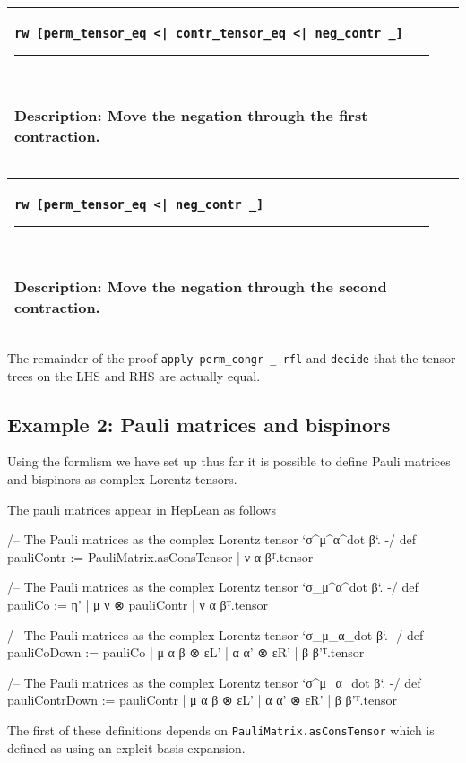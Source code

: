 \documentclass[a4paper, 11pt]{article}
\newcommand{\proofstep}[3]{
  \arrayrulecolor{mycolor}
\begin{center}
\begin{tabular}{|p{3in}| p{3in}|}
\hline
{#1
}\newline 
\hrule~\newline
#2
  & ~\newline
\makebox[3in]{%
#3}
  \\ \hline
\end{tabular}
\end{center}
\arrayrulecolor{black}
}
\begin{document}
\proofstep{\lstinline!rw [perm_tensor_eq <| contr_tensor_eq <| neg_contr _]!}{
  Description: Move the negation through the first contraction.
}{
  \begin{tikzpicture}
    \node[draw=black] (A) at (0,0) {perm};
    \node[draw=black] (B) at (0,-1) {contr 0 0};
    \node[draw=red] (C) at (0,-2) {neg};
    \node[draw=red] (D) at (0,-3) {contr 0 1};
    \node[draw=black] (E) at (0,-4) {prod};
    \node[draw=black] (F1) at (-1,-5) {A};
    \node[draw=black] (F2) at (1,-5) {S};
    \path [->] (A) edge (B);
    \path [->] (B) edge (C);
    \path [->, color = red] (C) edge (D);
    \path [->, color = red] (D) edge (E);
    \path [->] (E) edge (F1);
    \path [->] (E) edge (F2);
  \end{tikzpicture}
}

\proofstep{\lstinline!rw [perm_tensor_eq <| neg_contr _]!}{
  Description: Move the negation through the second contraction.
}{
  \begin{tikzpicture}
    \node[draw=black] (A) at (0,0) {perm};
    \node[draw=red] (B) at (0,-1) {neg};
    \node[draw=red] (C) at (0,-2) {contr 0 0};
    \node[draw=black] (D) at (0,-3) {contr 0 1};
    \node[draw=black] (E) at (0,-4) {prod};
    \node[draw=black] (F1) at (-1,-5) {A};
    \node[draw=black] (F2) at (1,-5) {S};
    \path [->] (A) edge (B);
    \path [->, color = red] (B) edge (C);
    \path [->, color = red] (C) edge (D);
    \path [->] (D) edge (E);
    \path [->] (E) edge (F1);
    \path [->] (E) edge (F2);
  \end{tikzpicture}
}

The remainder of the proof \lstinline|apply perm_congr _ rfl| and \lstinline|decide| that the 
tensor trees on the LHS and RHS are actually equal.
\subsection{Example 2: Pauli matrices and bispinors} \label{sec:examplePauliBispinor}

Using the formlism we have set up thus far it is possible to define Pauli matrices and bispinors 
as complex Lorentz tensors.
 
The pauli matrices appear in HepLean as follows 
\begin{code}
/-- The Pauli matrices as the complex Lorentz tensor `σ^μ^α^{dot β}`. -/
def pauliContr := {PauliMatrix.asConsTensor | ν α β}ᵀ.tensor

/-- The Pauli matrices as the complex Lorentz tensor `σ_μ^α^{dot β}`. -/
def pauliCo := {η' | μ ν ⊗ pauliContr | ν α β}ᵀ.tensor

/-- The Pauli matrices as the complex Lorentz tensor `σ_μ_α_{dot β}`. -/
def pauliCoDown := {pauliCo | μ α β ⊗ εL' | α α' ⊗ εR' | β β'}ᵀ.tensor

/-- The Pauli matrices as the complex Lorentz tensor `σ^μ_α_{dot β}`. -/
def pauliContrDown := {pauliContr | μ α β ⊗ εL' | α α' ⊗ εR' | β β'}ᵀ.tensor
\end{code}
The first of these definitions depends on \lstinline|PauliMatrix.asConsTensor| which is defined as 
using an explcit basis expansion. 
\end{document}
